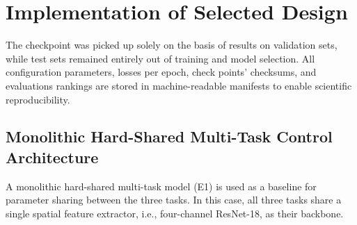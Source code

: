 \section{Implementation of Selected Design}

 The checkpoint was picked up solely on the basis of results on validation sets, while test sets remained entirely out of training and model selection. All configuration parameters, losses per epoch, check points' checksums, and evaluations rankings are stored in machine-readable manifests to enable scientific reproducibility.

\subsection{Monolithic Hard-Shared Multi-Task Control Architecture}

A monolithic hard-shared multi-task model (E1) is used as a baseline for parameter sharing between the three tasks. In this case, all three tasks share a single spatial feature extractor, i.e., four-channel ResNet-18, as their backbone.


